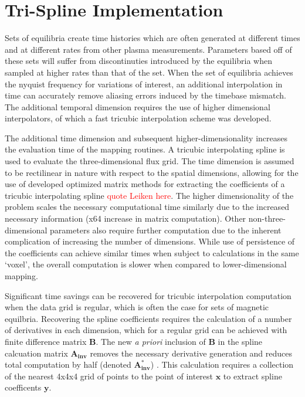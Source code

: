 \documentclass[12pt,floatfix,showpacs]{revtex4-1}
\newcommand{\note}[1]{\textcolor{red}{#1}}
\begin{document}
\section{Tri-Spline Implementation}\label{sec:trispline}

Sets of equilibria create time histories which are often generated at different times and at different rates from other plasma measurements. Parameters based off of these sets will suffer from discontinuties introduced by the equilibria when sampled at higher rates than that of the set.  When the set of equilibria achieves the nyquist frequency for variations of interest, an additional interpolation in time can accurately remove aliasing errors induced by the timebase mismatch. The additional temporal dimension requires the use of higher dimensional interpolators, of which a fast tricubic interpolation scheme was developed. 

The additional time dimension and subsequent higher-dimensionality increases the evaluation time of the mapping routines. A tricubic interpolating spline is used to evaluate the three-dimensional flux grid. The time dimension is assumed to be rectilinear in nature with respect to the spatial dimensions, allowing for the use of developed optimized matrix methods for extracting the coefficients of a tricubic interpolating spline \note{quote Leiken here}. The higher dimensionality of the problem scales the necessary computational time similarly due to the increased necessary information (x64 increase in matrix computation). Other non-three-dimensional parameters also require further computation due to the inherent complication of increasing the number of dimensions. While use of persistence of the coefficients can achieve similar times when subject to calculations in the same `voxel', the overall computation is slower when compared to lower-dimensional mapping.

Significant time savings can be recovered for tricubic interpolation computation when the data grid is regular, which is often the case for sets of magnetic equilbria. Recovering the spline coefficients requires the calculation of a number of derivatives in each dimension, which for a regular grid can be achieved with finite difference matrix $\boldsymbol{B}$. The new \emph{a priori} inclusion of $\boldsymbol{B}$ in the spline calcuation matrix $\boldsymbol{A_{inv}}$ removes the necessary derivative generation and reduces total computation by half (denoted 
$\boldsymbol{A_{inv}^*}$) . This calculation requires a collection of the nearest 4x4x4 grid of points to the point of interest $\boldsymbol{x}$ to extract spline coefficents $\boldsymbol{y}$.
\end{document}
